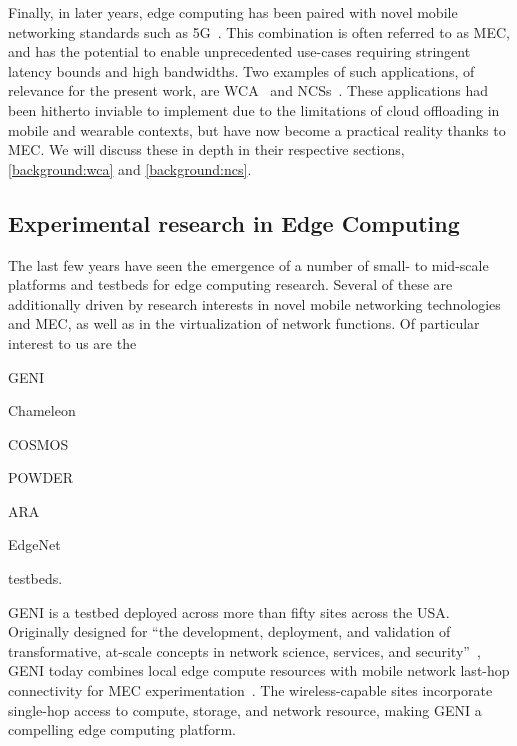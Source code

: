 Finally, in later years, edge computing has been paired with novel mobile networking standards such as 5G~\cite{hassan2019edge,pham2020survey,wan2020efficient}.
This combination is often referred to as \gls{MEC}, and has the potential to enable unprecedented use-cases requiring stringent latency bounds and high bandwidths.
Two examples of such applications, of relevance for the present work, are \acl{WCA}~\cite{ha2014towards,chen2018application,wang2020scaling,chen2017empirical,chen2018application} and \aclp{NCS}~\cite{sasaki2016vehicle,wang2018bandwidth,wan2020efficient}.
These applications had been hitherto inviable to implement due to the limitations of cloud offloading in mobile and wearable contexts, but have now become a practical reality thanks to \gls{MEC}.
We will discuss these in depth in their respective sections, \cref{background:wca} and \cref{background:ncs}.

\subsection{Experimental research in Edge Computing}

The last few years have seen the emergence of a number of small- to mid-scale platforms and testbeds for edge computing research.
Several of these are additionally driven by research interests in novel mobile networking technologies and \gls{MEC}, as well as in the virtualization of network functions.
Of particular interest to us are the
\begin{inlineenum}
    \item \acs{GENI}
    \item Chameleon
    \item \acs{COSMOS}
    \item \acs{POWDER}
    \item \acs{ARA}
    \item EdgeNet
\end{inlineenum} testbeds.

\gls{GENI} is a testbed deployed across more than fifty sites across the \gls{USA}.
Originally designed for ``the development, deployment, and validation of transformative, at-scale concepts in network science, services, and security''~\cite{berman2014geni}, \gls{GENI} today combines local edge compute resources with mobile network last-hop connectivity for \gls{MEC} experimentation~\cite{gosain2017geni}.
The wireless-capable sites incorporate single-hop access to compute, storage, and network resource, making \gls{GENI} a compelling edge computing platform.

